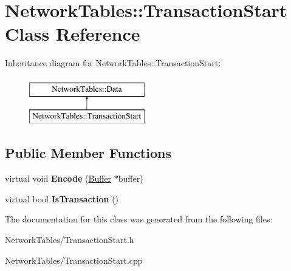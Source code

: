 \hypertarget{classNetworkTables_1_1TransactionStart}{
\section{NetworkTables::TransactionStart Class Reference}
\label{classNetworkTables_1_1TransactionStart}
}
Inheritance diagram for NetworkTables::TransactionStart:\begin{figure}[H]
\begin{center}
\leavevmode
\includegraphics[height=2.000000cm]{classNetworkTables_1_1TransactionStart}
\end{center}
\end{figure}
\subsection*{Public Member Functions}
\begin{DoxyCompactItemize}
\item 
\hypertarget{classNetworkTables_1_1TransactionStart_aba8a0355667a301734747953256797db}{
virtual void {\bfseries Encode} (\hyperlink{classNetworkTables_1_1Buffer}{Buffer} $\ast$buffer)}
\label{classNetworkTables_1_1TransactionStart_aba8a0355667a301734747953256797db}

\item 
\hypertarget{classNetworkTables_1_1TransactionStart_aa2a8ddc813d14fb81c2e82a55b1db184}{
virtual bool {\bfseries IsTransaction} ()}
\label{classNetworkTables_1_1TransactionStart_aa2a8ddc813d14fb81c2e82a55b1db184}

\end{DoxyCompactItemize}


The documentation for this class was generated from the following files:\begin{DoxyCompactItemize}
\item 
NetworkTables/TransactionStart.h\item 
NetworkTables/TransactionStart.cpp\end{DoxyCompactItemize}
